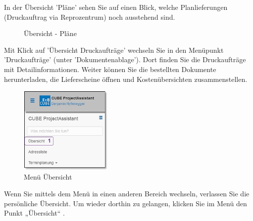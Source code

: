 \pagebreak

In der Übersicht 'Pläne'  sehen Sie auf einen Blick, welche Planlieferungen (Druckauftrag via Reprozentrum) noch ausstehend sind. 

\begin{figure}[H] %
\caption{Übersicht - Pläne}
\end{figure}

Mit Klick auf 'Übersicht Druckaufträge' wechseln Sie in den Menüpunkt 'Druckaufträge' (unter 'Dokumentenablage'). Dort finden Sie die Druckaufträge mit Detailinformationen. Weiter können Sie die bestellten Dokumente herunterladen, die Lieferscheine öffnen und Kostenübersichten zusammenstellen.

\vspace{\baselineskip}

\begin{figure}
  \vspace{-30pt}
  \begin{center}
    \includegraphics[width=0.4\textwidth]{../chapters/01_Einfuehrung/pictures/1-3-2_MenuepunktUebersicht.jpg}
  \end{center}
  \vspace{-20pt}
  \caption{Menü Übersicht}
  \vspace{-10pt}
\end{figure}
Wenn Sie mittels dem Menü in einen anderen Bereich wechseln, verlassen Sie die persönliche Übersicht. Um wieder dorthin zu gelangen, klicken Sie im Menü den Punkt „Übersicht“ .

